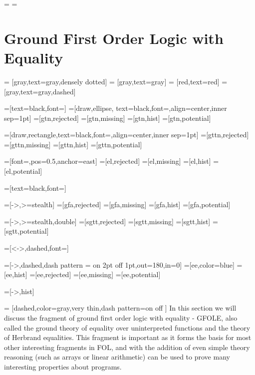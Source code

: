 \showboxdepth=\maxdimen
\showboxbreadth=\maxdimen

\chapter{Ground First Order Logic with Equality}
	\tikzset{every picture/.style = semithick,node distance=1.5cm}
	     = [gray,text=gray,densely dotted]
	 = [gray,text=gray]
	  = [red,text=red]
	= [gray,text=gray,dashed]

  =[text=black,font=\tiny]
    =[draw,ellipse,  text=black,font=\scriptsize,align=center,inner sep=1pt]
   =[gtn,rejected]
   =[gtn,missing]
   =[gtn,hist]
   =[gtn,potential]
  
	 =[draw,rectangle,text=black,font=\scriptsize,align=center,inner sep=1pt]
  =[gttn,rejected]
	=[gttn,missing]
	=[gttn,hist]
	=[gttn,potential]
  
	   =[font=\tiny,pos=0.5,anchor=east] %
     =[el,rejected]
     =[el,missing]
     =[el,hist]
     =[el,potential]
  
	   =[text=black,font=\small]

	   =[->,>=stealth] %
	  =[gfa,rejected]
	  =[gfa,missing]
	  =[gfa,hist]
	  =[gfa,potential]
  
	 =[->,>=stealth,double] %
   =[sgtt,rejected]
  =[sgtt,missing]
  =[sgtt,hist]
  =[sgtt,potential]
  
	   =[<->,dashed,font=\tiny]

     =[->,dashed,dash pattern = on 2pt off 1pt,out=180,in=0]
     =[ee,color=blue]
    =[ee,hist]
     =[ee,rejected]
     =[ee,missing]
     =[ee,potential]

	   =[->,hist]

	 = [dashed,color=gray,very thin,dash pattern=on \pgflinewidth off \pgflinewidth]
	\lstset{tabsize=3}
In this section we will discuss the fragment of ground first order logic with equality - GFOLE,
also called the ground theory of equality over uninterpreted functions and the theory of Herbrand equalities.
This fragment is important as it forms the basis for most other interesting fragments in FOL,
and with the addition of even simple theory reasoning (such as arrays or linear arithmetic)
can be used to prove many interesting properties about programs.

